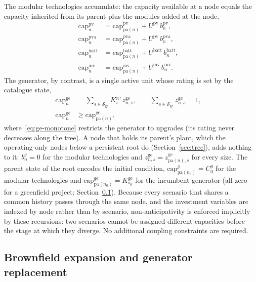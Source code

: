 \documentclass[11pt,a4paper]{article}
\theoremstyle{plain}
\theoremstyle{definition}
\newcommand{\pa}{\mathrm{pa}}
\begin{document}
The modular technologies accumulate: the capacity available at a node equals the capacity
inherited from its parent plus the modules added at the node,
\begin{align}
  \mathrm{cap}^{\mathrm{pv}}_n   &= \mathrm{cap}^{\mathrm{pv}}_{\pa(n)}
      + U^{\mathrm{pv}}\, b^{\mathrm{pv}}_n, \label{eq:cap-pv}\\
  \mathrm{cap}^{\mathrm{pva}}_n  &= \mathrm{cap}^{\mathrm{pva}}_{\pa(n)}
      + U^{\mathrm{pv}}\, b^{\mathrm{pva}}_n, \label{eq:cap-pva}\\
  \mathrm{cap}^{\mathrm{batt}}_n &= \mathrm{cap}^{\mathrm{batt}}_{\pa(n)}
      + U^{\mathrm{batt}}\, b^{\mathrm{batt}}_n, \label{eq:cap-batt}\\
  \mathrm{cap}^{\mathrm{inv}}_n  &= \mathrm{cap}^{\mathrm{inv}}_{\pa(n)}
      + U^{\mathrm{inv}}\, b^{\mathrm{inv}}_n. \label{eq:cap-inv}
\end{align}
The generator, by contrast, is a single active unit whose rating is set by the catalogue
state,
\begin{align}
  \mathrm{cap}^{\mathrm{ge}}_n &= \sum_{s\in\mathcal{S}_{\mathrm{ge}}}
      K^{\mathrm{ge}}_s\, z^{\mathrm{ge}}_{n,s},
  \qquad \sum_{s\in\mathcal{S}_{\mathrm{ge}}} z^{\mathrm{ge}}_{n,s}=1,
  \label{eq:cap-ge}\\
  \mathrm{cap}^{\mathrm{ge}}_n &\geq \mathrm{cap}^{\mathrm{ge}}_{\pa(n)},
  \label{eq:ge-monotone}
\end{align}
where~\eqref{eq:ge-monotone} restricts the generator to upgrades (its rating never
decreases along the tree). A node that holds its parent's plant, which the operating-only
nodes below a persistent root do (Section~\ref{sec:tree}), adds nothing to it:
$b^{g}_n=0$ for the modular technologies and $z^{\mathrm{ge}}_{n,s}=z^{\mathrm{ge}}_{\pa(n),s}$
for every size. The parent state of the root encodes the initial condition,
$\mathrm{cap}^{g}_{\pa(n_0)}=C^{g}_0$ for the modular technologies and
$\mathrm{cap}^{\mathrm{ge}}_{\pa(n_0)}=K^{\mathrm{ge}}_{s_0}$ for the incumbent generator
(all zero for a greenfield project; Section~\ref{sec:brownfield}). Because every scenario
that shares a common history passes through the same node, and the investment variables
are indexed by node rather than by scenario, non-anticipativity is enforced implicitly by
these recursions: two scenarios cannot be assigned different capacities before the stage
at which they diverge. No additional coupling constraints are required.

\subsection{Brownfield expansion and generator replacement}
\label{sec:brownfield}
\end{document}

